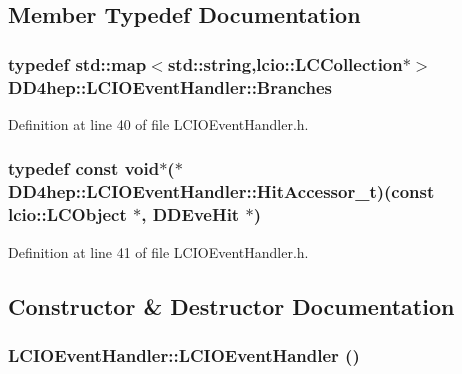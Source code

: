 \subsection{Member Typedef Documentation}
\hypertarget{class_d_d4hep_1_1_l_c_i_o_event_handler_abb97052600fb229e9fdc6cfeefdc4177}{
\subsubsection[{Branches}]{\setlength{\rightskip}{0pt plus 5cm}typedef std::map$<$std::string,lcio::LCCollection$\ast$$>$ {\bf DD4hep::LCIOEventHandler::Branches}}}
\label{class_d_d4hep_1_1_l_c_i_o_event_handler_abb97052600fb229e9fdc6cfeefdc4177}


Definition at line 40 of file LCIOEventHandler.h.\hypertarget{class_d_d4hep_1_1_l_c_i_o_event_handler_a45f21e8a77b574e7332b5b6f2861ea1b}{
\subsubsection[{HitAccessor\_\-t}]{\setlength{\rightskip}{0pt plus 5cm}typedef const void$\ast$($\ast$ {\bf DD4hep::LCIOEventHandler::HitAccessor\_\-t})(const lcio::LCObject $\ast$, {\bf DDEveHit} $\ast$)}}
\label{class_d_d4hep_1_1_l_c_i_o_event_handler_a45f21e8a77b574e7332b5b6f2861ea1b}


Definition at line 41 of file LCIOEventHandler.h.

\subsection{Constructor \& Destructor Documentation}
\hypertarget{class_d_d4hep_1_1_l_c_i_o_event_handler_a0b2f4815441b47379605f1059f892a59}{
\subsubsection[{LCIOEventHandler}]{\setlength{\rightskip}{0pt plus 5cm}LCIOEventHandler::LCIOEventHandler ()}}
\label{class_d_d4hep_1_1_l_c_i_o_event_handler_a0b2f4815441b47379605f1059f892a59}


